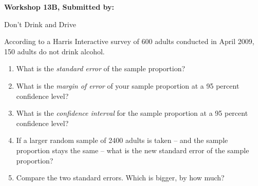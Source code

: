 \documentclass[11pt, chapterprefix=true]{scrbook}\usepackage[]{graphicx}\usepackage[]{color}
\begin{document}
\begin{exercises}
\begin{solution}
\end{solution}

\clearpage

    \begin{exercise}  %


    \begin{center}
\begin{flushleft}\textbf{\large \hfill Workshop 13B, Submitted by: }\end{flushleft}

\end{center}

Don’t Drink and Drive


According to a Harris Interactive survey of 600 adults conducted in April 2009, 150 adults do not drink alcohol.

\begin{enumerate}
\item What is the \textit{standard error} of the sample proportion?
\item What is the \textit{margin of error} of your sample proportion at a 95 percent confidence level?
\item What is the \textit{confidence interval} for the sample proportion at a 95 percent confidence level?
\item If a larger random sample of 2400 adults is taken -- and the sample proportion stays the same -- what is the new standard error of the sample proportion?
\item Compare the two standard errors. Which is bigger, by how much?
\end{enumerate}


\end{exercise} 
\begin{solution}  %


\end{solution}
\end{exercises}
\end{document}
